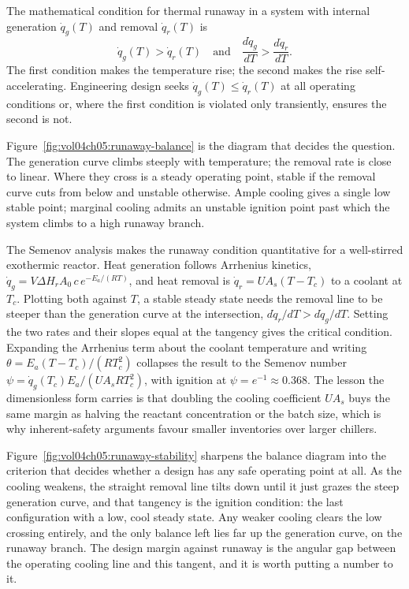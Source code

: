 The mathematical condition for thermal runaway in a system with
internal generation $\dot{q}_g(T)$ and removal $\dot{q}_r(T)$ is
\[
\dot{q}_g(T) > \dot{q}_r(T) \quad \text{and} \quad
\frac{d\dot{q}_g}{dT} > \frac{d\dot{q}_r}{dT}.
\]
The first condition makes the temperature rise; the second makes the
rise self-accelerating. Engineering design seeks $\dot{q}_g(T) \leq
\dot{q}_r(T)$ at all operating conditions or, where the first
condition is violated only transiently, ensures the second is not.



Figure~\ref{fig:vol04ch05:runaway-balance} is the diagram that decides
the question. The generation curve climbs steeply with temperature; the
removal rate is close to linear. Where they cross is a steady operating
point, stable if the removal curve cuts from below and unstable
otherwise. Ample cooling gives a single low stable point; marginal
cooling admits an unstable ignition point past which the system climbs
to a high runaway branch.

\begin{mastery}
The Semenov analysis makes the runaway condition quantitative for a
well-stirred exothermic reactor. Heat generation follows Arrhenius
kinetics, $\dot{q}_g = V \Delta H_r A_0 \, c \, e^{-E_a/(RT)}$, and heat
removal is $\dot{q}_r = U A_s (T - T_c)$ to a coolant at $T_c$. Plotting
both against $T$, a stable steady state needs the removal line to be
steeper than the generation curve at the intersection,
$d\dot{q}_r/dT > d\dot{q}_g/dT$. Setting the two rates and their slopes
equal at the tangency gives the critical condition. Expanding the
Arrhenius term about the coolant temperature and writing
$\theta = E_a(T - T_c)/(RT_c^2)$ collapses the result to the Semenov
number $\psi = \dot{q}_g(T_c) E_a/(U A_s R T_c^2)$, with ignition at
$\psi = e^{-1} \approx 0.368$. The lesson the dimensionless form carries
is that doubling the cooling coefficient $U A_s$ buys the same margin as
halving the reactant concentration or the batch size, which is why
inherent-safety arguments favour smaller inventories over larger chillers.
\end{mastery}



Figure~\ref{fig:vol04ch05:runaway-stability} sharpens the balance diagram
into the criterion that decides whether a design has any safe operating
point at all. As the cooling weakens, the straight removal line tilts down
until it just grazes the steep generation curve, and that tangency is the
ignition condition: the last configuration with a low, cool steady state.
Any weaker cooling clears the low crossing entirely, and the only balance
left lies far up the generation curve, on the runaway branch. The design
margin against runaway is the angular gap between the operating cooling line
and this tangent, and it is worth putting a number to it.

